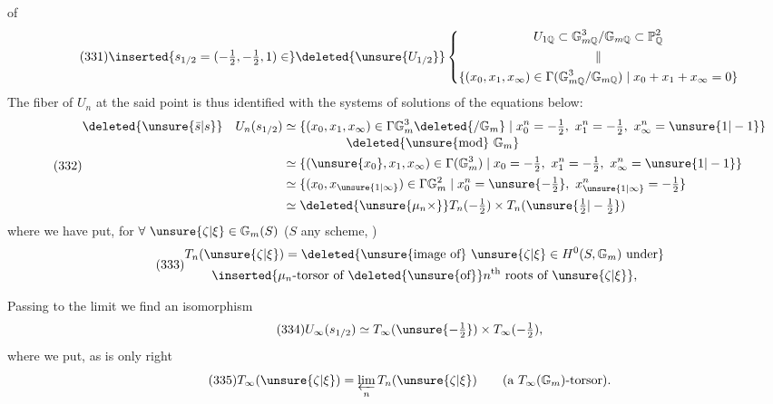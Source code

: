 of 
\[
\tag{331}
\inserted{s_{1/2}=(-\tfrac12,-\tfrac12,1)\in}
\deleted{\unsure{U_{1/2}}}
\left\{\begin{gathered}
U_{1\mathbb Q}\subset\mathbb G_{m\mathbb Q}^{3}/\mathbb G_{m\mathbb Q}\subset\mathbb P_{\mathbb Q}^{2}\\
\Vert\\
\{(x_0,x_1,x_{\infty})\in\Gamma(\mathbb G_{m\mathbb Q}^{3}/\mathbb G_{m\mathbb Q})\mid x_0+x_1+x_{\infty}=0\}
\end{gathered}\right.
\]
The  fiber of $U_n$ at the said point is thus identified with the systems of solutions of the equations below:
\[
\tag{332}
\begin{aligned}
\deleted{\unsure{\bar s|s}}\quad U_n(s_{1/2})
&\simeq\{(x_0,x_1,x_{\infty})\in\Gamma\mathbb G_m^3\deleted{/\mathbb G_m}\mid x_0^n=-\tfrac12,\ x_1^n=-\tfrac12,\ x_{\infty}^{n}=\unsure{1|-1}\}\\[-2pt]
&\hspace{5em}\deleted{\unsure{\mathrm{mod}}\ \mathbb G_m}\\
&\simeq\{(\unsure{x_0},x_1,x_{\infty})\in\Gamma(\mathbb G_m^3)\mid x_0=-\tfrac12,\ x_1^n=-\tfrac12,\ x_{\infty}^n=\unsure{1|-1}\}\\
&\simeq\{(x_0,x_{\unsure{1|\infty}})\in\Gamma\mathbb G_m^2\mid x_0^n=\unsure{-\tfrac12},\ x_{\unsure{1|\infty}}^n=-\tfrac12\}\\
&\simeq\deleted{\unsure{\mu_n\times}}T_n(-\tfrac12)\times T_n(\unsure{\tfrac12|-\tfrac12})
\end{aligned}
\]
where we have put, for $\forall\ \unsure{\zeta|\xi}\in\mathbb G_m(S)$ ($S$ any scheme, )
\[
\tag{333}
\begin{gathered}
T_n(\unsure{\zeta|\xi})=
\deleted{\unsure{\text{image of}}\ \unsure{\zeta|\xi}\in H^0(S,\mathbb G_m)\ \text{under}}\\
\inserted{\mu_n\text{-torsor of }\deleted{\unsure{\text{of}}}n^{\text{th}}\text{ roots of }\unsure{\zeta|\xi}},
\end{gathered}
\]

Passing to the limit we find an isomorphism
\[
\tag{334}
U_{\infty}(s_{1/2})\simeq T_{\infty}(\unsure{-\tfrac12})\times T_{\infty}(-\tfrac12),
\]
where we put, as is only right
\[
\tag{335}
T_{\infty}(\unsure{\zeta|\xi})=\varprojlim_n T_n(\unsure{\zeta|\xi})
\qquad(\text{a }T_{\infty}(\mathbb G_m)\text{-torsor}).
\]

